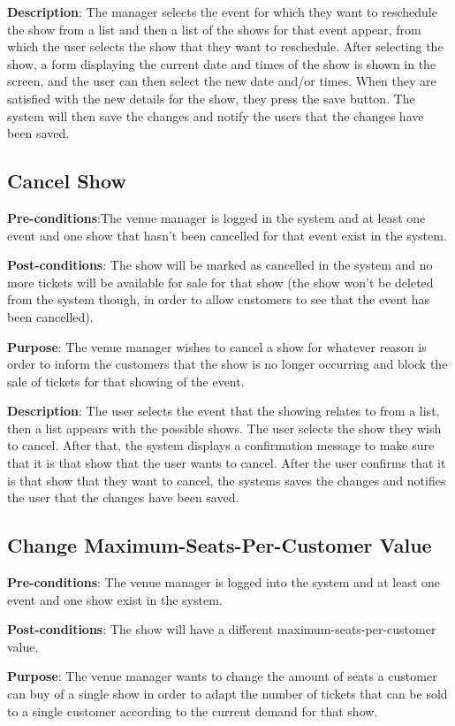 \textbf{Description}: The manager selects the event for which they want
to reschedule the show from a list and then a list of the shows for that
event appear, from which the user selects the show that they want to
reschedule. After selecting the show, a form displaying the current date
and times of the show is shown in the screen, and the user can then select the
new date and/or times. When they are satisfied with the new details for
the show, they press the save button. The system will then save the changes
and notify the users that the changes have been saved.

\subsection{Cancel Show}
\textbf{Pre-conditions}:The venue manager is logged in the system and at
least one event and one show that hasn't been cancelled for that event
exist in the system.

\textbf{Post-conditions}: The show will be marked as cancelled in the system
and no more tickets will be available for sale for that show (the show
won't be deleted from the system though, in order to allow customers
to see that the event has been cancelled).

\textbf{Purpose}: The venue manager wishes to cancel a show for whatever
reason is order to inform the customers that the show is no longer
occurring and block the sale of tickets for that showing of the event.

\textbf{Description}: The user selects the event that the showing
relates to from a list, then a list appears with the possible shows.
The user selects the show they wish to cancel. After that, the system
displays a confirmation message to make sure that it is that show that
the user wants to cancel. After the user confirms that it is that show
that they want to cancel, the systems saves the changes and notifies
the user that the changes have been saved.

\subsection{Change Maximum-Seats-Per-Customer Value}
\textbf{Pre-conditions}: The venue manager is logged into the system
and at least one event and one show exist in the system.

\textbf{Post-conditions}: The show will have a different
maximum-seats-per-customer value.

\textbf{Purpose}: The venue manager wants to change the amount of
seats a customer can buy of a single show in order to adapt the
number of tickets that can be sold to a single customer according
to the current demand for that show.

